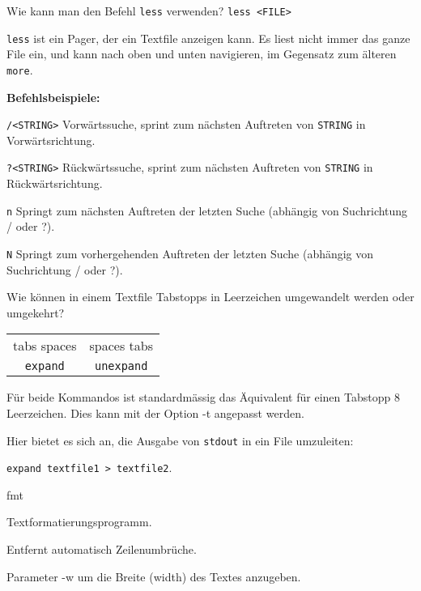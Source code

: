 \begin{flashcard}[Command]{Wie kann man den Befehl \texttt{less} verwenden?}
	\texttt{less <FILE>}
	
	\texttt{less} ist ein Pager, der ein Textfile anzeigen kann. Es liest nicht immer das ganze File ein, und kann nach oben und unten navigieren, im Gegensatz zum älteren \texttt{more}.
	
	\textbf{Befehlsbeispiele:}
	
	\begin{description}
		\item \texttt{/<STRING>} Vorwärtssuche, sprint zum nächsten Auftreten von \texttt{STRING} in Vorwärtsrichtung.
		
		\item \texttt{?<STRING>} Rückwärtssuche, sprint zum nächsten Auftreten von \texttt{STRING} in Rückwärtsrichtung.
		
		\item \texttt{n} Springt zum nächsten Auftreten der letzten Suche (abhängig von Suchrichtung / oder ?).
		
		\item \texttt{N} Springt zum vorhergehenden Auftreten der letzten Suche (abhängig von Suchrichtung / oder ?).
	\end{description}
\end{flashcard}

\begin{flashcard}[Command]{Wie können in einem Textfile Tabstopps in Leerzeichen umgewandelt werden oder umgekehrt?}
	\begin{tabular}{cc}
		tabs \textrightarrow spaces & spaces \textrightarrow tabs\\
		\texttt{expand} & \texttt{unexpand}
	\end{tabular}
	
	\vspace{0.5cm}
	
	Für beide Kommandos ist standardmässig das Äquivalent für einen Tabstopp 8 Leerzeichen. Dies kann mit der Option -t angepasst werden.
	
	\vspace{0.5cm}
	
	Hier bietet es sich an, die Ausgabe von \texttt{stdout} in ein File umzuleiten:
	
	\texttt{expand textfile1 > textfile2}.
\end{flashcard}

\begin{flashcard}[Command]{fmt}
	\begin{description}
		\item Textformatierungsprogramm.
		
		\item Entfernt automatisch Zeilenumbrüche.
		
		\item Parameter -w um die Breite (width) des Textes anzugeben.
	\end{description}
\end{flashcard}

